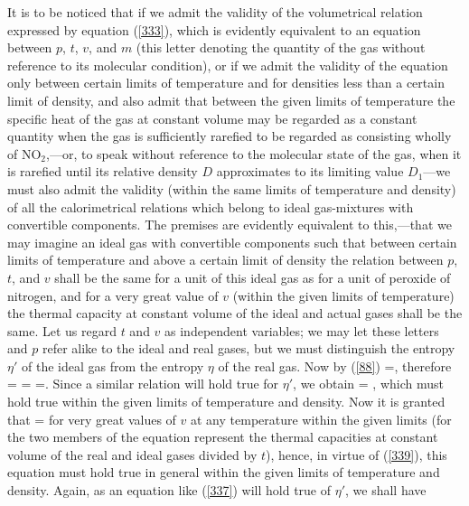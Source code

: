 \documentclass[12pt]{article}
\begin{document}
It is to be noticed that if we admit the validity of the volumetrical relation expressed by equation (\ref{333}), which is evidently equivalent to an equation between $p$, $t$, $v$, and $m$ (this letter denoting the quantity of the gas without reference to its molecular condition), or if we admit the validity of the equation only between certain limits of temperature and for densities less than a certain limit of density, and also admit that between the given limits of temperature the specific heat of the gas at constant volume may be regarded as a constant quantity when the gas is sufficiently rarefied to be regarded as consisting wholly of NO$_2$,---or, to speak without reference to the molecular state of the gas, when it is rarefied until its relative density $D$ approximates to its limiting value $D_1$---we must also admit the validity (within the same limits of temperature and density) of all the calorimetrical relations which belong to ideal gas-mixtures with convertible components. The premises are evidently equivalent to this,---that we may imagine an ideal gas with convertible components such that between certain limits of temperature and above a certain limit of density the relation between $p$, $t$, and $v$ shall be the same for a unit of this ideal gas as for a unit of peroxide of nitrogen, and for a very great value of $v$ (within the given limits of temperature) the thermal capacity at constant volume of the ideal and actual gases shall be the same. Let us regard $t$ and $v$ as independent variables; we may let these letters and $p$ refer alike to the ideal and real gases, but we must distinguish the entropy $\eta'$ of the ideal gas from the entropy $\eta$ of the real gas. Now by (\ref{88})
\eqs {}=,          \label{337}\eqe
therefore          
\eqs  {} =  =   =.   \label{338}\eqe
Since a similar relation will hold true for $\eta'$, we obtain
\eqs {} = , \label{339}\eqe
which must hold true within the given limits of temperature and density. Now it is granted that
\eqs {} = \label{340}\eqe
for very great values of $v$ at any temperature within the given limits (for the two members of the equation represent the thermal capacities at constant volume of the real and ideal gases divided by $t$), hence, in virtue of (\ref{339}), this equation must hold true in general within the given limits of temperature and density. Again, as an equation like (\ref{337}) will hold true of $\eta'$, we shall have
\end{document}
